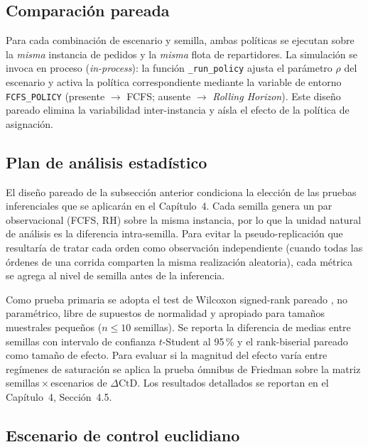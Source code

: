 \documentclass[12pt,letterpaper,oneside]{book}
\begin{document}
	\subsection{Comparación pareada}

	Para cada combinación de escenario y semilla, ambas políticas se ejecutan sobre la
	\emph{misma} instancia de pedidos y la \emph{misma} flota de repartidores.  La
	simulación se invoca en proceso (\emph{in-process}): la función
	\texttt{\_run\_policy} ajusta el parámetro $\rho$ del escenario y activa la política
	correspondiente mediante la variable de entorno \texttt{FCFS\_POLICY} (presente
	$\rightarrow$ FCFS; ausente $\rightarrow$ \textit{Rolling Horizon}).  Este diseño pareado
	elimina la variabilidad inter-instancia y aísla el efecto de la política de
	asignación.

	\subsection{Plan de análisis estadístico}
	\label{sec:plan_analisis}

	El diseño pareado de la subsección anterior condiciona la elección de las
	pruebas inferenciales que se aplicarán en el Capítulo~4.  Cada semilla
	genera un par observacional (FCFS, RH) sobre la misma instancia, por lo
	que la unidad natural de análisis es la diferencia intra-semilla.  Para
	evitar la pseudo-replicación \citep{Hurlbert1984} que resultaría de tratar
	cada orden como observación independiente (cuando todas las órdenes de
	una corrida comparten la misma realización aleatoria), cada métrica se
	agrega al nivel de semilla antes de la inferencia.

	Como prueba primaria se adopta el test de Wilcoxon signed-rank pareado
	\citep{Wilcoxon1945}, no paramétrico, libre de supuestos de normalidad y
	apropiado para tamaños muestrales pequeños ($n \leq 10$ semillas).  Se
	reporta la diferencia de medias entre semillas con intervalo de confianza
	$t$-Student al 95\,\% y el rank-biserial pareado como tamaño de efecto.
	Para evaluar si la magnitud del efecto varía entre regímenes de saturación
	se aplica la prueba ómnibus de Friedman \citep{Friedman1937} sobre la
	matriz semillas\,$\times$\,escenarios de $\Delta\text{CtD}$.  Los
	resultados detallados se reportan en el Capítulo~4, Sección~4.5.

	\subsection{Escenario de control euclidiano}
	\label{sec:control_euclidiano}
\end{document}
